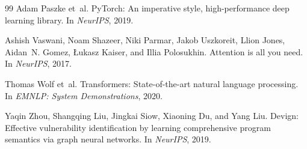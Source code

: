 \documentclass{article}
\begin{document}
\begin{thebibliography}{99}
Adam Paszke et~al.
\newblock PyTorch: An imperative style, high-performance deep learning library.
\newblock In \emph{NeurIPS}, 2019.

Ashish Vaswani, Noam Shazeer, Niki Parmar, Jakob Uszkoreit, Llion Jones, Aidan~N. Gomez, {\L}ukasz Kaiser, and Illia Polosukhin.
\newblock Attention is all you need.
\newblock In \emph{NeurIPS}, 2017.

Thomas Wolf et~al.
\newblock Transformers: State-of-the-art natural language processing.
\newblock In \emph{EMNLP: System Demonstrations}, 2020.

Yaqin Zhou, Shangqing Liu, Jingkai Siow, Xiaoning Du, and Yang Liu.
\newblock Devign: Effective vulnerability identification by learning comprehensive program semantics via graph neural networks.
\newblock In \emph{NeurIPS}, 2019.

\end{thebibliography}
\end{document}
